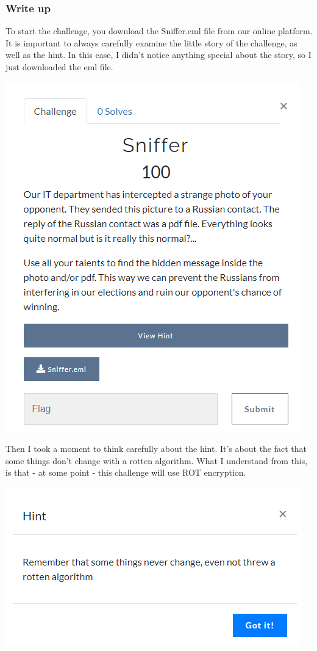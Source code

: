 \documentclass[../main.tex]{subfiles}
\begin{document}
\subsubsection{Write up}
To start the challenge, you download the Sniffer.eml file from our online platform. It is important to always carefully examine the little story of the challenge, as well as the hint. In this case, I didn't notice anything special about the story, so I just downloaded the eml file.
 \begin{center}
    \includegraphics[width=0.5\linewidth]{images/Robbe/sniffer_writeup1.png}
\end{center}
Then I took a moment to think carefully about the hint. It's about the fact that some things don't change with a rotten algorithm. What I understand from this, is that - at some point - this challenge will use ROT encryption.
 \begin{center}
    \includegraphics[width=0.5\linewidth]{images/Robbe/sniffer_writeup2.png}
\end{center}
\end{document}
